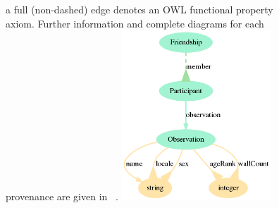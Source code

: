 \begin{figure}[!ht]
{																																																																																																																																																																																																																																																																																																																																																																																																																																																														a full (non-dashed) edge denotes an OWL functional property axiom.
																																																																																																																																																																																																																																																																																																																																																																																																																																																															Further information and complete diagrams for each provenance are given in ~\cite{losd}.}\label{dia}
																																																																																																																																																																																																																																																																																																																																																																																																																																																																\includegraphics[width=0.5\textwidth]{ontologies/facebook-legacy-AntonioAnzoategui18022013Friendship.ttl/draw}
																																																																																																																																																																																																																																																																																																																																																																																																																																																																	\begin{flushleft}

\end{flushleft}
\end{figure}
